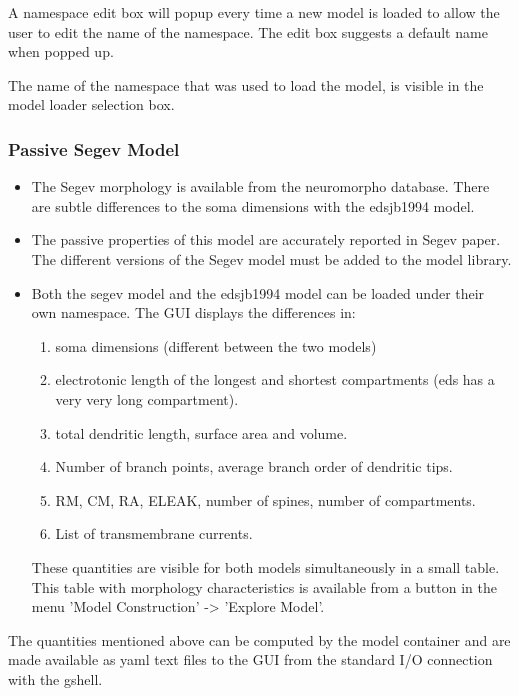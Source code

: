 \documentclass[12pt]{article}
\begin{document}
A namespace edit box will popup every time a new model is loaded to
allow the user to edit the name of the namespace.  The edit box
suggests a default name when popped up.

The name of the namespace that was used to load the model, is visible
in the model loader selection box.


\subsubsection{Passive Segev Model}
\begin{itemize}
\item The Segev morphology is available from the
  neuromorpho database.  There are subtle differences to the soma
  dimensions with the edsjb1994 model.
\item The passive properties of this model are accurately reported in
  Segev paper.  The different versions of the Segev model must be
  added to the model library.
\item Both the segev model and the edsjb1994 model can be loaded under
  their own namespace.  The GUI displays the differences in:
  \begin{enumerate}
  \item soma dimensions (different between the two models)
  \item electrotonic length of the longest and shortest compartments (eds has a very very long compartment).
  \item total dendritic length, surface area and volume.
  \item Number of branch points, average branch order of dendritic tips.
  \item RM, CM, RA, ELEAK, number of spines, number of compartments.
  \item List of transmembrane currents.
  \end{enumerate}
  These quantities are visible for both models simultaneously in a
  small table.  This table with morphology characteristics is
  available from a button in the menu 'Model Construction' -> 'Explore
  Model'.
\end{itemize}
The quantities mentioned above can be computed by the model container
and are made available as yaml text files to the GUI from the standard
I/O connection with the gshell.
\end{document}
